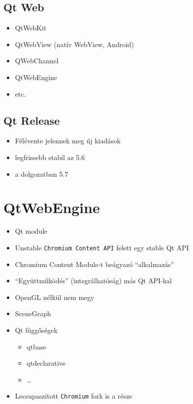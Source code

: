 \documentclass[12pt]{report}
\begin{document}
\subsection{Qt Web}
\begin{itemize}
    \item QtWebKit
    \item QtWebView (natív WebView, Android)
    \item QWebChannel
    \item QtWebEngine
    \item etc.
\end{itemize}

\subsection{Qt Release}
\begin{itemize}
    \item Félévente jelennek meg új kiadások
    \item legfrissebb stabil az 5.6
    \item a dolgozatban 5.7
\end{itemize}

\section{QtWebEngine}
\begin{itemize}
    \item Qt module
    \item Unstable \texttt{Chromium Content API} felett egy stable Qt API
    \item Chromium Content Module-t beágyazó ``alkalmazás''
    \item ``Együttműködés'' (integrálhatóság) más Qt API-kal
    \item OpenGL nélkül nem megy
    \item SceneGraph
    \item Qt függőségek
        \begin{itemize}
            \item qtbase
            \item qtdeclarative
            \item \dots
        \end{itemize}
    \item Lecsupaszított \texttt{Chromium} fork is a része
\end{itemize}
\end{document}
